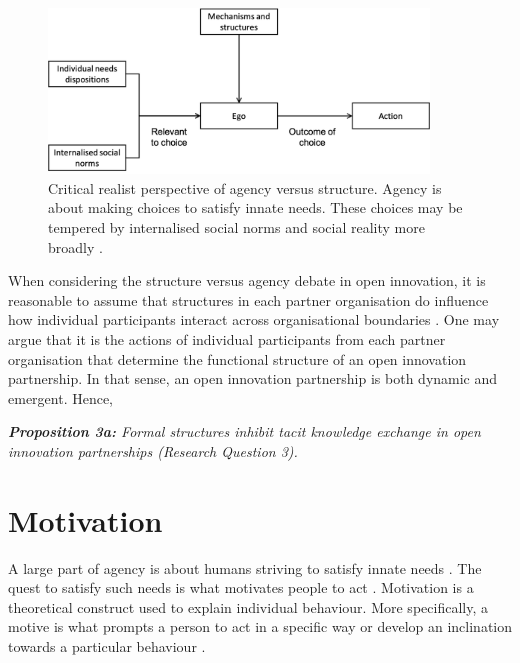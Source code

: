 \begin{figure}[h!]
    \centering
    \includegraphics[width=0.9\textwidth]{Images/agency_structure_loyal.png}
    \caption[Critical realist perspective of agency versus structure]{Critical realist perspective of agency versus structure. Agency is about making choices to satisfy innate needs. These choices may be tempered by internalised social norms and social reality more broadly \citep{loyal2001agency}.}
    \label{fig:agency_structure}
\end{figure}

When considering the structure versus agency debate in open innovation, it is reasonable to assume that structures in each partner organisation do influence how individual participants interact across organisational boundaries \citep{llanes2018competitive}. One may argue that it is the actions of individual participants from each partner organisation that determine the functional structure of an open innovation partnership. In that sense, an open innovation partnership is both dynamic and emergent. Hence, \bigskip

\begin{tcolorbox}
\textit{\textbf{Proposition 3a:} Formal structures inhibit tacit knowledge exchange in open innovation partnerships (Research Question 3).}
\end{tcolorbox}

\section{Motivation}

A large part of agency is about humans striving to satisfy innate needs \citep{deci2001need}. The quest to satisfy such needs is what motivates people to act \citep{bandura1989human}. Motivation is a theoretical construct used to explain individual behaviour. More specifically, a motive is what prompts a person to act in a specific way or develop an inclination towards a particular behaviour \citep{pardee1990motivation}. \medskip

